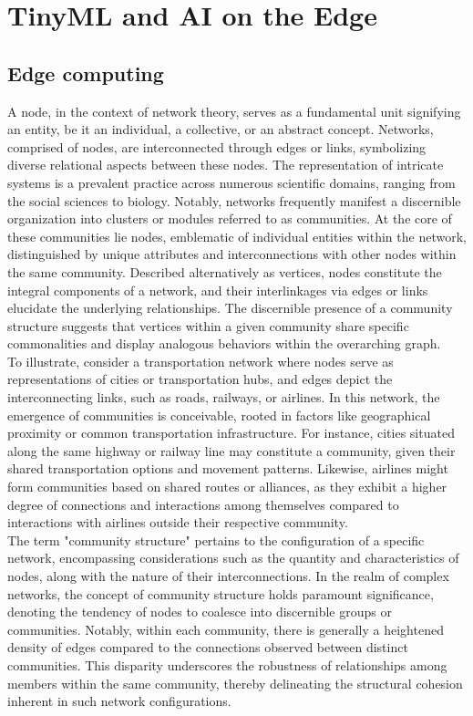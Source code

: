 \section{TinyML and AI on the Edge}
\subsection{Edge computing}

\indent A node, in the context of network theory, serves as a fundamental unit signifying an entity, be it an individual, a collective, or an abstract concept. Networks, comprised of nodes, are interconnected through edges or links, symbolizing diverse relational aspects between these nodes. The representation of intricate systems is a prevalent practice across numerous scientific domains, ranging from the social sciences to biology. Notably, networks frequently manifest a discernible organization into clusters or modules referred to as communities. At the core of these communities lie nodes, emblematic of individual entities within the network, distinguished by unique attributes and interconnections with other nodes within the same community. Described alternatively as vertices, nodes constitute the integral components of a network, and their interlinkages via edges or links elucidate the underlying relationships. The discernible presence of a community structure suggests that vertices within a given community share specific commonalities and display analogous behaviors within the overarching graph. \\

To illustrate, consider a transportation network where nodes serve as representations of cities or transportation hubs, and edges depict the interconnecting links, such as roads, railways, or airlines. In this network, the emergence of communities is conceivable, rooted in factors like geographical proximity or common transportation infrastructure. For instance, cities situated along the same highway or railway line may constitute a community, given their shared transportation options and movement patterns. Likewise, airlines might form communities based on shared routes or alliances, as they exhibit a higher degree of connections and interactions among themselves compared to interactions with airlines outside their respective community.\\

The term "community structure" pertains to the configuration of a specific network, encompassing considerations such as the quantity and characteristics of nodes, along with the nature of their interconnections. In the realm of complex networks, the concept of community structure holds paramount significance, denoting the tendency of nodes to coalesce into discernible groups or communities. Notably, within each community, there is generally a heightened density of edges compared to the connections observed between distinct communities. This disparity underscores the robustness of relationships among members within the same community, thereby delineating the structural cohesion inherent in such network configurations.\\ 

